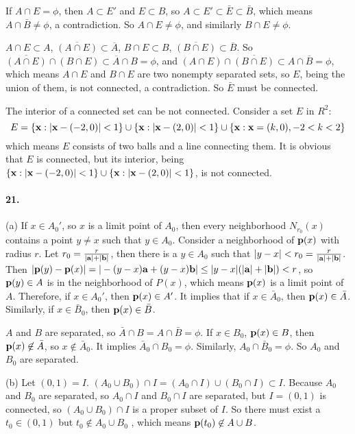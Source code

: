 \documentclass[a4paper]{article}
\begin{document}
If $A\cap E=\phi$, then $A\subset E'$ and $E\subset B$, so $A\subset E'\subset\bar{E}\subset\bar{B}$, which means $A\cap\bar{B}\neq\phi$, a contradiction. So $A\cap E\neq\phi$, and similarly $B\cap E\neq\phi$. 
\smallskip

$A\cap E\subset A$,\; $\overline{(A\cap E)}\subset\overline{A}$,\; $B\cap E\subset B$,\; $\overline{(B\cap E)}\subset\overline{B}$. So $\overline{(A\cap E)}\cap(B\cap E)\subset\overline{A}\cap B=\phi$, and $(A\cap E)\cap\overline{(B\cap E)}\subset A\cap\overline{B}=\phi$, which means $A\cap E$ and $B\cap E$ are two nonempty separated sets, so $E$, being the union of them, is not connected, a contradiction. So $\bar{E}$ must be connected.
\medskip

The interior of a connected set can be not connected. Consider a set $E$ in $R^2:$
\[
E=\{\mathbf{x}:|\mathbf{x}-(-2,0)|<1\}\cup\{\mathbf{x}:|\mathbf{x}-(2,0)|<1\}\cup\{\mathbf{x}:\mathbf{x}=(k,0),-2<k<2\}
\]
which means $E$ consists of two balls and a line connecting them. It is obvious that $E$ is connected, but its interior, being $\{\mathbf{x}:|\mathbf{x}-(-2,0)|<1\}\cup\{\mathbf{x}:|\mathbf{x}-(2,0)|<1\}$, is not connected.

\paragraph{21.}
(a) If $x\in A_0'$, so $x$ is a limit point of $A_0$, then every neighborhood $N_{r_0}(x)$ contains a point $y\neq x$ such that $y\in A_0$. Consider a neighborhood of $\mathbf{p}(x)$ with radius $r$. Let $r_0=\frac{r}{|\mathbf{a}|+|\mathbf{b}|}$, then there is a $y\in A_0$ such that $|y-x|<r_0=\frac{r}{|\mathbf{a}|+|\mathbf{b}|}$. Then $|\mathbf{p}(y)-\mathbf{p}(x)|=|-(y-x)\mathbf{a}+(y-x)\mathbf{b}|\leq|y-x|(|\mathbf{a}|+|\mathbf{b}|)<r$, so $\mathbf{p}(y)\in A$ is in the neighborhood of $P(x)$, which means $\mathbf{p}(x)$ is a limit point of $A$. Therefore, if $x\in A_0'$, then $\mathbf{p}(x)\in A'$. It implies that if $x\in\bar{A}_0$, then $\mathbf{p}(x)\in\bar{A}$. Similarly, if $x\in\bar{B}_0$, then $\mathbf{p}(x)\in\bar{B}$.

$A$ and $B$ are separated, so $\bar{A}\cap B=A\cap\bar{B}=\phi$. If $x\in B_0$, $\mathbf{p}(x)\in B$, then $\mathbf{p}(x)\not\in \bar{A}$, so $x\not\in \bar{A}_0$. It implies $\bar{A}_0\cap B_0=\phi$. Similarly, $A_0\cap\bar{B}_0=\phi$. So $A_0$ and $B_0$ are separated. 
\medskip

(b)
Let $(0,1)=I$. $(A_0\cup B_0)\cap I=(A_0\cap I)\cup(B_0\cap I)\subset I$. Because $A_0$ and $B_0$ are separated, so $A_0\cap I$ and $B_0\cap I$ are separated, but $I=(0,1)$ is connected, so $(A_0\cup B_0)\cap I$ is a proper subset of $I$. So there must exist a $t_0\in(0,1)$ but $t_0\not\in A_0\cup B_0$ , which means $\mathbf{p}(t_0)\not\in A\cup B$.
\medskip
\end{document}
